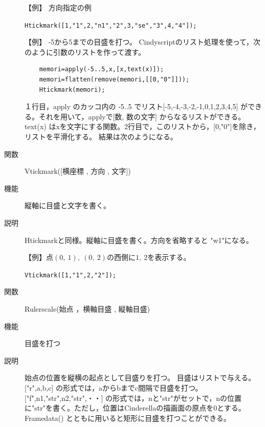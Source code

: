 \documentclass[papersize,a4paper,12pt,uplatex]{jsarticle}
\begin{document}
\begin{description}
\vspace{\baselineskip}
【例】 方向指定の例

\hspace{10mm} \verb|Htickmark([1,"1",2,"n1","2",3,"se","3",4,"4"]);|

\vspace{\baselineskip}
\begin{center}

\end{center}

【例】  -5から5までの目盛を打つ。
  Cindyscriptのリスト処理を使って，次のように引数のリストを作って渡す。
\begin{verbatim}
    memori=apply(-5..5,x,[x,text(x)]);
    memori=flatten(remove(memori,[[0,"0"]]));
    Htickmark(memori);
\end{verbatim}
１行目，apply のカッコ内の -5..5 でリスト[-5,-4,-3,-2,-1,0,1,2,3,4,5] ができる。それを用いて，applyで[数, 数の文字] からなるリストができる。text(x) はxを文字にする関数。2行目で，このリストから，[0,"0"]を除き，リストを平滑化する。 結果は次のようになる。

\begin{center} \scalebox{0.9}{}\end{center}

\hypertarget{vtickmark}{}
\item[関数]  Vtickmark([横座標 , 方向 , 文字])
\item[機能]  縦軸に目盛と文字を書く。
\item[説明]  Htickmarkと同様。縦軸に目盛を書く。方向を省略すると "w1"になる。

\vspace{\baselineskip}
【例】点$(0,\ 1),\ (0,\ 2)$の西側に$1,\ 2$を表示する。

\hspace{10mm}  \verb|Vtickmark([1,"1",2,"2"]);|

\vspace{\baselineskip}
\hypertarget{rulerscale}{}
\item[関数]  Rulerscale(始点 ，横軸目盛 , 縦軸目盛)
\item[機能]  目盛を打つ
\item[説明]  始点の位置を縦横の起点として目盛りを打つ。
  目盛はリストで与える。
  ["r",a,b,c]  の形式では，aからbまでc間隔で目盛を打つ。
  ["f",n1,"str",n2,"str",・・] の形式では，nと"str"がセットで，nの位置に"str"を書く。ただし，位置はCinderellaの描画面の原点を0とする。
  Framedata() とともに用いると矩形に目盛を打つことができる。
  

\end{description}
\end{document}
